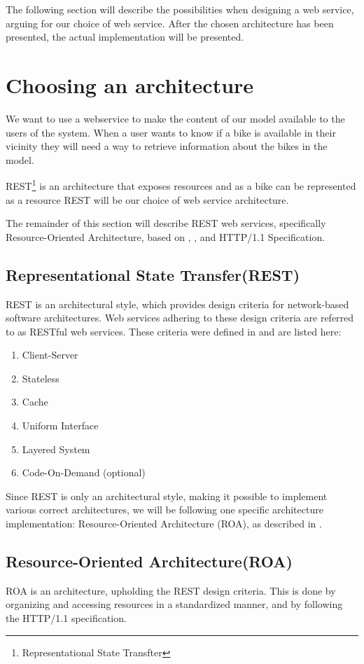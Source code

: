The following section will describe the possibilities when designing a web service, arguing for our choice of web service.
After the chosen architecture has been presented, the actual implementation will be presented.

\section{Choosing an architecture}
We want to use a webservice to make the content of our model available to the users of the system.
When a user wants to know if a bike is available in their vicinity they will need a way to retrieve information about the bikes in the model.

REST\footnote{Representational State Transfter} is an architecture that exposes resources and as a bike can be represented as a resource REST will be our choice of web service architecture.

The remainder of this section will describe REST web services, specifically Resource-Oriented Architecture, based on \citet{restful_web_services}, \citet{fielding_dissertation}, and HTTP/1.1 Specification\cite{http_specification}.


\subsection{Representational State Transfer(REST)}
REST is an architectural style, which provides design criteria for network-based software architectures.
Web services adhering to these design criteria are referred to as RESTful web services.
These criteria were defined in \citet[Chapter 5]{fielding_dissertation} and are listed here:
\begin{enumerate}
\item Client-Server
\item Stateless
\item Cache
\item Uniform Interface
\item Layered System
\item Code-On-Demand (optional)
\end{enumerate}

Since REST is only an architectural style, making it possible to implement various correct architectures, we will be following one specific architecture implementation: Resource-Oriented Architecture (ROA), as described in \citet{restful_web_services}.

\subsection{Resource-Oriented Architecture(ROA)}\label{webservice:roa}
ROA is an architecture, upholding the REST design criteria.
This is done by organizing and accessing resources in a standardized manner, and by following the HTTP/1.1 specification.

